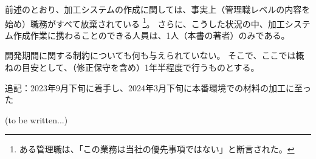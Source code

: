 




前述のとおり、加工システムの作成に関しては、事実上（管理職レベルの内容を始め）職務がすべて放棄されている
\footnote{ある管理職は、「この業務は当社の優先事項ではない」と断言された。}。
さらに、こうした状況の中、加工システム作成作業に携わることのできる人員は、1人（本書の著者）のみである。



開発期間に関する制約についても何も与えられていない。
そこで、ここでは概ねの目安として、（修正保守を含め）1年半程度で行うものとする。
\begin{marker}
追記：2023年9月下旬に着手し、2024年3月下旬に本番環境での材料の加工に至った
\end{marker}



(to be written...)


